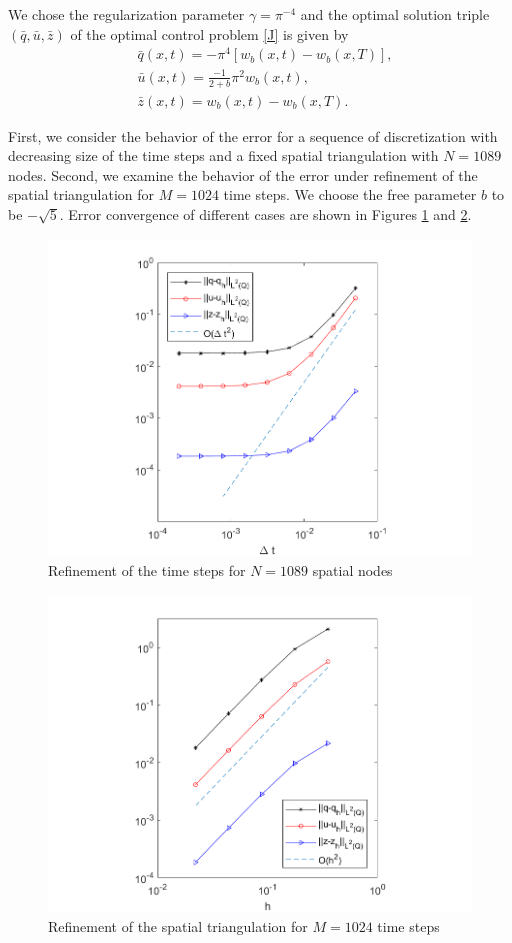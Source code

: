 We chose the regularization parameter $\gamma=\pi^{-4}$ and the optimal solution triple $(\bar{q}, \bar{u}, \bar{z})$ of the optimal control problem \eqref{J} is given by
\begin{align*}
	&\bar{q}(x, t)=-\pi^4\left[w_b(x, t)-w_b(x, T)\right],\\
	&\bar{u}(x, t)=\frac{-1}{2+b}\pi^2w_b(x, t),\\
	&\bar{z}(x, t)=w_b(x, t)-w_b(x, T).
\end{align*}

First, we consider the behavior of the error for a sequence of discretization with decreasing size of the time steps and a fixed spatial triangulation with $N=1089$ nodes. Second, we examine the behavior of the error under refinement of the spatial triangulation for $M=1024$ time steps. We choose the free parameter $b$ to be $-\sqrt{5}$. Error convergence of different cases are shown in Figures \ref{fig:opt_t} and \ref{fig:opt_x}.

\begin{figure}[h!]
	\centering
	\includegraphics[width=\linewidth]{../freefem++/err_t}
	\caption{Refinement of the time steps for $N =1089$ spatial nodes}
	\label{fig:opt_t}
\end{figure}

\begin{figure}[h!]
	\centering
	\includegraphics[width=\linewidth]{../freefem++/err_x}
	\caption{Refinement of the spatial triangulation for $M = 1024$ time steps}
	\label{fig:opt_x}
\end{figure}
